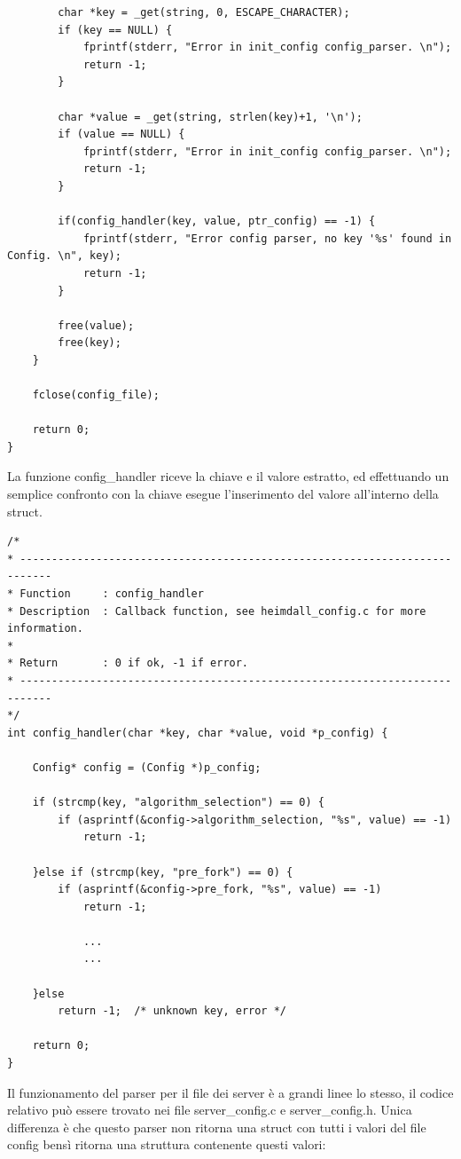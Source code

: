 \documentclass[italian]{tktltiki2}
\begin{document}
\begin{lstlisting}
        char *key = _get(string, 0, ESCAPE_CHARACTER);
        if (key == NULL) {
            fprintf(stderr, "Error in init_config config_parser. \n");
            return -1;
        }

        char *value = _get(string, strlen(key)+1, '\n');
        if (value == NULL) {
            fprintf(stderr, "Error in init_config config_parser. \n");
            return -1;
        }

        if(config_handler(key, value, ptr_config) == -1) {
            fprintf(stderr, "Error config parser, no key '%s' found in Config. \n", key);
            return -1;
        }

        free(value);
        free(key);
    }

    fclose(config_file);

    return 0;
}
\end{lstlisting}
La funzione config\_handler riceve la chiave e il valore estratto, ed effettuando un semplice confronto con la chiave esegue l'inserimento del valore all'interno della struct.

\begin{lstlisting}
/*
* ---------------------------------------------------------------------------
* Function     : config_handler
* Description  : Callback function, see heimdall_config.c for more information.
*
* Return       : 0 if ok, -1 if error.
* ---------------------------------------------------------------------------
*/
int config_handler(char *key, char *value, void *p_config) {

    Config* config = (Config *)p_config;
        
    if (strcmp(key, "algorithm_selection") == 0) {
        if (asprintf(&config->algorithm_selection, "%s", value) == -1)
            return -1;

    }else if (strcmp(key, "pre_fork") == 0) {
        if (asprintf(&config->pre_fork, "%s", value) == -1)
            return -1;
            
            ...
            ...
            
    }else
        return -1;  /* unknown key, error */

    return 0;
}
\end{lstlisting}
Il funzionamento del parser per il file dei server è a grandi linee lo stesso, il codice relativo può essere trovato nei file server\_config.c e server\_config.h. Unica differenza è che questo parser non ritorna una struct con tutti i valori del file config bensì ritorna una struttura contenente questi valori:
\end{document}
